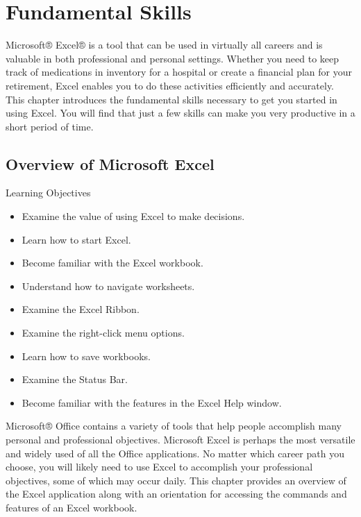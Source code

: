 \chapter{Fundamental Skills}\label{ch01:fundamental_skills}

Microsoft® Excel® is a tool that can be used in virtually all careers and is valuable in both professional and personal settings. Whether you need to keep track of medications in inventory for a hospital or create a financial plan for your retirement, Excel enables you to do these activities efficiently and accurately. This chapter introduces the fundamental skills necessary to get you started in using Excel. You will find that just a few skills can make you very productive in a short period of time.

\section{Overview of Microsoft Excel}

\begin{center}
	\begin{objbox}{Learning Objectives}
		\begin{itemize}
			\setlength{\itemsep}{0pt}
			\setlength{\parskip}{0pt}
			\setlength{\parsep}{0pt}
			
			\item Examine the value of using Excel to make decisions.
			\item Learn how to start Excel.
			\item Become familiar with the Excel workbook.
			\item Understand how to navigate worksheets.
			\item Examine the Excel Ribbon.
			\item Examine the right-click menu options.
			\item Learn how to save workbooks.
			\item Examine the Status Bar.
			\item Become familiar with the features in the Excel Help window.
			
		\end{itemize}
	\end{objbox}
\end{center}

Microsoft® Office contains a variety of tools that help people accomplish many personal and professional objectives. Microsoft Excel is perhaps the most versatile and widely used of all the Office applications. No matter which career path you choose, you will likely need to use Excel to accomplish your professional objectives, some of which may occur daily. This chapter provides an overview of the Excel application along with an orientation for accessing the commands and features of an Excel workbook.

